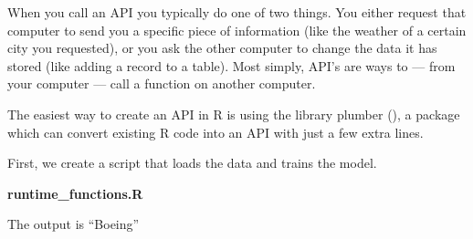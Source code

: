 \documentclass[]{book}
\newenvironment{Shaded}{\begin{snugshade}}{\end{snugshade}}
\newcommand{\ControlFlowTok}[1]{\textcolor[rgb]{0.13,0.29,0.53}{\textbf{#1}}}
\newcommand{\DataTypeTok}[1]{\textcolor[rgb]{0.13,0.29,0.53}{#1}}
\newcommand{\DecValTok}[1]{\textcolor[rgb]{0.00,0.00,0.81}{#1}}
\newcommand{\KeywordTok}[1]{\textcolor[rgb]{0.13,0.29,0.53}{\textbf{#1}}}
\newcommand{\NormalTok}[1]{#1}
\newcommand{\OperatorTok}[1]{\textcolor[rgb]{0.81,0.36,0.00}{\textbf{#1}}}
\newcommand{\StringTok}[1]{\textcolor[rgb]{0.31,0.60,0.02}{#1}}
\begin{document}
When you call an API you typically do one of two things. You either request that computer to send you a specific piece of information (like the weather of a certain city you requested), or you ask the other computer to change the data it has stored (like adding a record to a table). Most simply, API's are ways to --- from your computer --- call a function on another computer.

The easiest way to create an API in R is using the library plumber (\citet{R-plumber}), a package which can convert existing R code into an API with just a few extra lines.

First, we create a script that loads the data and trains the model.

\textbf{runtime\_functions.R}

\begin{Shaded}
\end{Shaded}

The output is ``Boeing''
\end{document}

